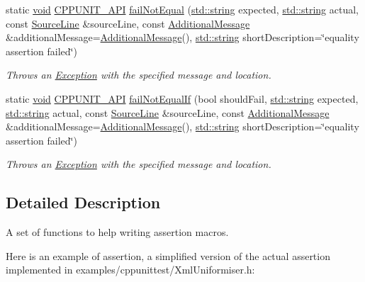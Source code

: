 \begin{DoxyCompactItemize}
static \hyperlink{wglew_8h_aeea6e3dfae3acf232096f57d2d57f084}{void} \hyperlink{_cpp_unit_api_8h_a0a4ad180f07bc3823bae0e453718ef6a}{C\-P\-P\-U\-N\-I\-T\-\_\-\-A\-P\-I} \hyperlink{struct_asserter_ac6234767e7d986bace97dc44f8d80d6c}{fail\-Not\-Equal} (\hyperlink{glew_8h_ae84541b4f3d8e1ea24ec0f466a8c568b}{std\-::string} expected, \hyperlink{glew_8h_ae84541b4f3d8e1ea24ec0f466a8c568b}{std\-::string} actual, const \hyperlink{class_source_line}{Source\-Line} \&source\-Line, const \hyperlink{class_additional_message}{Additional\-Message} \&additional\-Message=\hyperlink{class_additional_message}{Additional\-Message}(), \hyperlink{glew_8h_ae84541b4f3d8e1ea24ec0f466a8c568b}{std\-::string} short\-Description=\char`\"{}equality assertion failed\char`\"{})
\begin{DoxyCompactList}\small\item\em Throws an \hyperlink{class_exception}{Exception} with the specified message and location. \end{DoxyCompactList}\item 
static \hyperlink{wglew_8h_aeea6e3dfae3acf232096f57d2d57f084}{void} \hyperlink{_cpp_unit_api_8h_a0a4ad180f07bc3823bae0e453718ef6a}{C\-P\-P\-U\-N\-I\-T\-\_\-\-A\-P\-I} \hyperlink{struct_asserter_a3a805c9f8c641d65353bcff2da80624f}{fail\-Not\-Equal\-If} (bool should\-Fail, \hyperlink{glew_8h_ae84541b4f3d8e1ea24ec0f466a8c568b}{std\-::string} expected, \hyperlink{glew_8h_ae84541b4f3d8e1ea24ec0f466a8c568b}{std\-::string} actual, const \hyperlink{class_source_line}{Source\-Line} \&source\-Line, const \hyperlink{class_additional_message}{Additional\-Message} \&additional\-Message=\hyperlink{class_additional_message}{Additional\-Message}(), \hyperlink{glew_8h_ae84541b4f3d8e1ea24ec0f466a8c568b}{std\-::string} short\-Description=\char`\"{}equality assertion failed\char`\"{})
\begin{DoxyCompactList}\small\item\em Throws an \hyperlink{class_exception}{Exception} with the specified message and location. \end{DoxyCompactList}\end{DoxyCompactItemize}


\subsection{Detailed Description}
A set of functions to help writing assertion macros.

Here is an example of assertion, a simplified version of the actual assertion implemented in examples/cppunittest/\-Xml\-Uniformiser.\-h\-: 


